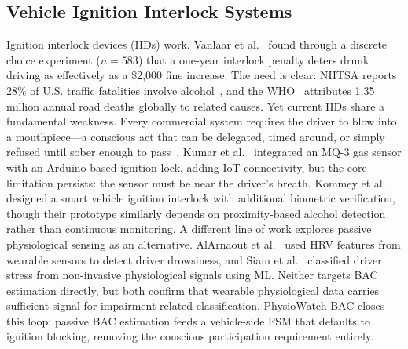 \documentclass[HARVARD,Times2COL]{WileyNJDv5}
\begin{document}
\subsection{Vehicle Ignition Interlock Systems}
Ignition interlock devices (IIDs) work. Vanlaar et al.~\citep{interlock2024} found through a discrete choice experiment ($n=583$) that a one-year interlock penalty deters drunk driving as effectively as a \$2,000 fine increase. The need is clear: NHTSA reports 28\% of U.S. traffic fatalities involve alcohol~\citep{nhtsa2022}, and the WHO~\citep{who2018} attributes 1.35 million annual road deaths globally to related causes.
Yet current IIDs share a fundamental weakness. Every commercial system requires the driver to blow into a mouthpiece---a conscious act that can be delegated, timed around, or simply refused until sober enough to pass~\citep{das2023, vedanarayanan2024}. Kumar et al.~\citep{kumar2023} integrated an MQ-3 gas sensor with an Arduino-based ignition lock, adding IoT connectivity, but the core limitation persists: the sensor must be near the driver's breath. Kommey et al.~\citep{kommey2022} designed a smart vehicle ignition interlock with additional biometric verification, though their prototype similarly depends on proximity-based alcohol detection rather than continuous monitoring.
A different line of work explores passive physiological sensing as an alternative. AlArnaout et al.~\citep{alarnaout2025} used HRV features from wearable sensors to detect driver drowsiness, and Siam et al.~\citep{siam2023} classified driver stress from non-invasive physiological signals using ML. Neither targets BAC estimation directly, but both confirm that wearable physiological data carries sufficient signal for impairment-related classification. PhysioWatch-BAC closes this loop: passive BAC estimation feeds a vehicle-side FSM that defaults to ignition blocking, removing the conscious participation requirement entirely.
\end{document}
